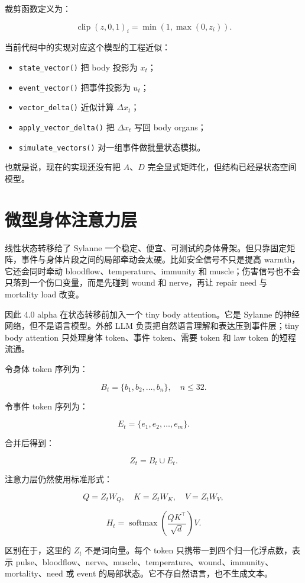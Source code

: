 \documentclass[UTF8,12pt]{ctexart}
\begin{document}
裁剪函数定义为：

\[
\operatorname{clip}(z,0,1)_i=\min(1,\max(0,z_i)).
\]

当前代码中的实现对应这个模型的工程近似：

\begin{itemize}
  \item \texttt{state\_vector()} 把 body 投影为 $x_t$；
  \item \texttt{event\_vector()} 把事件投影为 $u_t$；
  \item \texttt{vector\_delta()} 近似计算 $\Delta x_t$；
  \item \texttt{apply\_vector\_delta()} 把 $\Delta x_t$ 写回 body organs；
  \item \texttt{simulate\_vectors()} 对一组事件做批量状态模拟。
\end{itemize}

也就是说，现在的实现还没有把 $A$、$D$ 完全显式矩阵化，但结构已经是状态空间模型。

\section{微型身体注意力层}

线性状态转移给了 Sylanne 一个稳定、便宜、可测试的身体骨架。但只靠固定矩阵，事件与身体片段之间的局部牵动会太硬。比如安全信号不只是提高 warmth，它还会同时牵动 bloodflow、temperature、immunity 和 muscle；伤害信号也不会只落到一个伤口变量，而是先碰到 wound 和 nerve，再让 repair need 与 mortality load 改变。

因此 4.0 alpha 在状态转移前加入一个 tiny body attention。它是 Sylanne 的神经网络，但不是语言模型。外部 LLM 负责把自然语言理解和表达压到事件层；tiny body attention 只处理身体 token、事件 token、需要 token 和 law token 的短程流通。

令身体 token 序列为：

\[
B_t=\{b_1,b_2,\ldots,b_n\},\quad n\leq 32.
\]

令事件 token 序列为：

\[
E_t=\{e_1,e_2,\ldots,e_m\}.
\]

合并后得到：

\[
Z_t=B_t\cup E_t.
\]

注意力层仍然使用标准形式：

\[
Q=Z_tW_Q,\quad K=Z_tW_K,\quad V=Z_tW_V,
\]

\[
H_t=\operatorname{softmax}\left(\frac{QK^\top}{\sqrt{d}}\right)V.
\]

区别在于，这里的 $Z_t$ 不是词向量。每个 token 只携带一到四个归一化浮点数，表示 pulse、bloodflow、nerve、muscle、temperature、wound、immunity、mortality、need 或 event 的局部状态。它不存自然语言，也不生成文本。
\end{document}
